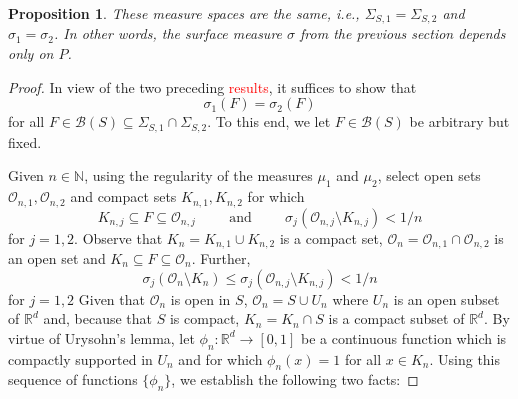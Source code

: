 \documentclass[11pt]{article}
\theoremstyle{theorem}
\newtheorem{proposition}[theorem]{Proposition}
\begin{document}
\begin{proposition}\label{prop:Endependence}
These measure spaces are the same, i.e., $\Sigma_{S,1}=\Sigma_{S,2}$ and $\sigma_1=\sigma_2$. In other words, the surface measure $\sigma$ from the previous section depends only on $P$. 
\end{proposition}
\begin{proof}
In view of the two preceding \textcolor{red}{results}, it suffices to show that 
\begin{equation*}
\sigma_1(F)=\sigma_2(F)
\end{equation*}
for all $F\in \mathcal{B}(S)\subseteq \Sigma_{S,1}\cap\Sigma_{S,2}$. To this end, we let $F\in\mathcal{B}(S)$ be arbitrary but fixed. 

Given $n\in\mathbb{N}$, using the regularity of the measures $\mu_1$ and $\mu_2$, select open sets $\mathcal{O}_{n,1},\mathcal{O}_{n,2}$ and compact sets $K_{n,1},K_{n,2}$ for which
\begin{equation*}
K_{n,j}\subseteq F\subseteq \mathcal{O}_{n,j}\hspace{1cm}\mbox{and}\hspace{1cm}\sigma_j(\mathcal{O}_{n,j}\setminus K_{n,j})<1/n
\end{equation*}
for $j=1,2$. Observe that $K_n=K_{n,1}\cup K_{n,2}$ is a compact set, $\mathcal{O}_n=\mathcal{O}_{n,1}\cap\mathcal{O}_{n,2}$ is an open set and $K_n\subseteq F\subseteq \mathcal{O}_n$. Further, 
\begin{equation*}
\sigma_j(\mathcal{O}_n\setminus K_n)\leq \sigma_j(\mathcal{O}_{n,j}\setminus K_{n,j})<1/n
\end{equation*}
for $j=1,2$ Given that $\mathcal{O}_n$ is open in $S$, $\mathcal{O}_n=S\cup U_n$ where $U_n$ is an open subset of $\mathbb{R}^d$ and, because that $S$ is compact, $K_n=K_n\cap S$ is a compact subset of $\mathbb{R}^d$. By virtue of Urysohn's lemma, let $\phi_n:\mathbb{R}^d\to [0,1]$ be a continuous function which is compactly supported in $U_n$ and for which $\phi_n(x)=1$ for all $x\in K_n$. Using this sequence of functions $\{\phi_n\}$, we establish the following two facts: 


\end{proof}
\end{document}
